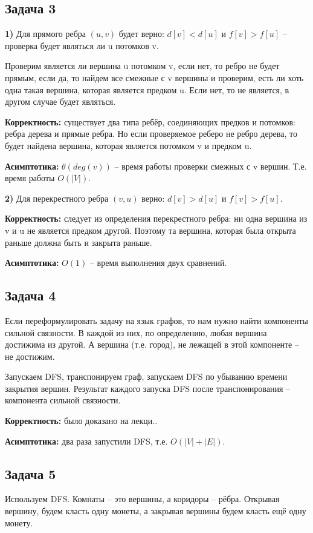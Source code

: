 \documentclass[a4paper,14pt]{article} %
\begin{document}
\subsection{Задача 3}
\textbf{1)} Для прямого ребра $(u, v)$ будет верно: $d[v] < d[u]$ и $f[v] > f[u]$ -- проверка будет являться ли u потомков v.

Проверим является ли вершина u потомком v, если нет, то ребро не будет прямым, если да, то найдем все смежные с v вершины и проверим, есть ли хоть одна такая вершина, которая является предком u. Если нет, то не является, в другом случае будет являться.

\textbf{Корректность:} существует два типа ребёр, соединяющих предков и потомков: ребра дерева и прямые ребра. Но если проверяемое реберо не ребро дерева, то будет найдена вершина, которая является потомком v и предком u.

\textbf{Асимптотика:} $\theta(deg(v))$ -- время работы проверки смежных с v вершин. Т.е. время работы $O(|V|)$.

\textbf{2)} Для перекрестного ребра $(v, u)$ верно: $d[v] > d[u]$ и $f[v] > f[u]$.

\textbf{Корректность:} следует из определения перекрестного ребра: ни одна вершина из v и u не является предком другой. Поэтому та вершина, которая была открыта раньше должна быть и закрыта раньше.

\textbf{Асимптотика:} $O(1)$ -- время выполнения двух сравнений.

\subsection{Задача 4}
Если переформулировать задачу на язык графов, то нам нужно найти компоненты сильной связности.
В каждой из них, по определению, любая вершина достижима из другой. А вершина (т.е. город), не лежащей в этой компоненте -- не достижим.

Запускаем DFS, транспонируем граф, запускаем DFS по убыванию времени закрытия вершин. Результат каждого запуска DFS после транспонирования -- компонента сильной связности.

\textbf{Корректность: } было доказано на лекци..

\textbf{Асимптотика:} два раза запустили DFS, т.е. $O(|V| + |E|)$.

\subsection{Задача 5}
Используем DFS. Комнаты -- это вершины, а коридоры -- рёбра. Открывая вершину, будем класть одну монеты, а закрывая вершины будем класть ещё одну монету.
\end{document}
